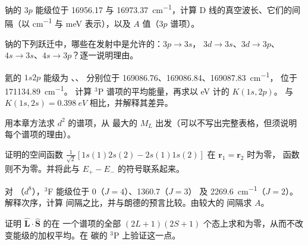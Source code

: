 \begin{exercise}[$\star\star$]\label{exo:b3:many-electron-atoms:6}
钠的 $3p$ 能级位于 16956.17 与 \qty{16973.37}{cm^{-1}}，计算
D 线的真空波长、它们的间隔（以 \unit{cm^{-1}} 与
meV 表示），以及 $A$ 值（$3p$ 谱项）。
\end{exercise}

\begin{exercise}[$\star\star$]\label{exo:b3:many-electron-atoms:7}
钠的下列跃迁中，哪些在发射中是允许的：$3p \to 3s$，
$3d \to 3s$、$3d \to 3p$、$4s \to 3s$、$4s \to 3p$？逐一说明理由。
\end{exercise}

\begin{exercise}[$\star\star$]\label{exo:b3:many-electron-atoms:8}
氦的 $1s2p$ 能级为 、、
 分别位于 169086.76、169086.84、\qty{169087.83}{cm^{-1}}，
 位于 \qty{171134.89}{cm^{-1}}。
计算 ${}^3$P 谱项的平均能量，再求以 eV 计的 $K(1s,2p)$。
与 $K(1s,2s) = \qty{0.398}{eV}$ 相比，并解释其差异。
\end{exercise}

\begin{exercise}[$\star\star$]\label{exo:b3:many-electron-atoms:9}
用本章方法求 $d^2$ 的谱项，从
最大的 $M_L$ 出发（可以不写出完整表格，但须说明每个谱项的理由）。
\end{exercise}

\begin{exercise}[$\star\star\star$]\label{exo:b3:many-electron-atoms:10}
证明的空间函数 $\frac{1}{\sqrt2}[1s(1)2s(2) -
2s(1)1s(2)]$ 在 $\mathbf r_1 = \mathbf r_2$ 时为零，
函数则不为零。并将此与 $E_+ - E_-$ 的符号联系起来。
\end{exercise}

\begin{exercise}[$\star\star\star$]\label{exo:b3:many-electron-atoms:11}
对 （$d^8$），${}^3$F 能级位于 0（$J = 4$）、1360.7（$J = 3$）
及 \qty{2269.6}{cm^{-1}}（$J = 2$）。解释次序，计算
间隔之比，并与朗德的预言比较。由较大的
间隔求 $A$。
\end{exercise}

\begin{exercise}[$\star\star\star$]\label{exo:b3:many-electron-atoms:12}
证明 $\hat{\mathbf L}\cdot\hat{\mathbf S}$ 的在
一个谱项的全部 $(2L+1)(2S+1)$ 个态上求和为零，从而不改变能级的加权平均。在
碳的 ${}^3$P 上验证这一点。
\end{exercise}

